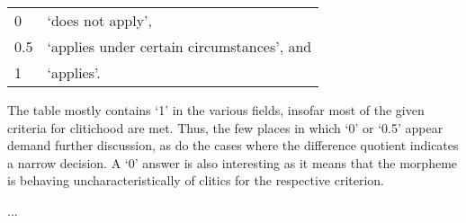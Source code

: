 \begin{longtabu} to .75\linewidth {X[1r] X[4l]}
0 & `does not apply',\\
0.5 & `applies under certain circumstances', and\\
1 & `applies'.\\
\end{longtabu}\addtocounter{table}{-1}

The table mostly contains `1' in the various fields, insofar most of the given 
criteria for clitichood are met. Thus, the few places in which `0' or `0.5' 
appear demand further discussion, as do the cases where the difference 
quotient indicates a narrow decision. A `0' answer is also interesting as it 
means that the morpheme is behaving uncharacteristically of clitics for the 
respective criterion.

...

